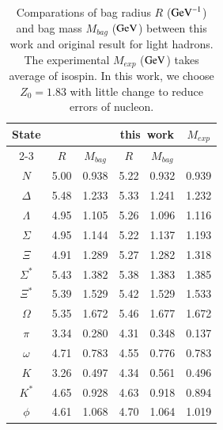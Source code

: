 \documentclass[prd,twocolumn,floatfix,nofootinbib]{revtex4}
\begin{document}
\renewcommand{\tabcolsep}{0.39cm}
\renewcommand{\arraystretch}{1.3}
\begin{table}[!htbp]
    \caption{Comparations of bag radius $R$ (${\rm GeV}^{-1}$) and bag mass $M_{bag}$ (${\rm GeV}$) between this work and original result for light hadrons.
    The experimental $M_{exp}$ (${\rm GeV}$) takes average of isospin.
    In this work, we choose $Z_{0}=1.83$ with little change to reduce errors of nucleon.}
    \label{tab:lighthadron}
    \begin{tabular}{cccccc}
        \hline\hline
        \multirow{2}{*}{State} & \multicolumn{2}{c}{\cite{Johnson:1975zp}} & \multicolumn{2}{c}{\rm this\ work} & \multirow{2}{*}{$M_{exp}$} \\ 
        \cline{2-3} \cline{4-5} 
        & $R$ & $M_{bag}$ & $R$ & $M_{bag}$ \\ \hline
        $N$               &5.00      &0.938      &5.22      &0.932      &0.939  \\ 
        $\Delta$          &5.48      &1.233      &5.33      &1.241      &1.232  \\ 
        $\Lambda$         &4.95      &1.105      &5.26      &1.096      &1.116  \\ 
        $\Sigma$          &4.95      &1.144      &5.22      &1.137      &1.193  \\ 
        $\Xi$             &4.91      &1.289      &5.27      &1.282      &1.318  \\ 
        $\Sigma^{\ast}$   &5.43      &1.382      &5.38      &1.383      &1.385  \\ 
        $\Xi^{\ast}$      &5.39      &1.529      &5.42      &1.529      &1.533  \\ 
        $\Omega$          &5.35      &1.672      &5.46      &1.677      &1.672  \\ 
        $\pi$             &3.34      &0.280      &4.31      &0.348      &0.137  \\ 
        $\omega$          &4.71      &0.783      &4.55      &0.776      &0.783  \\ 
        $K$               &3.26      &0.497      &4.34      &0.561      &0.496  \\ 
        $K^{\ast}$        &4.65      &0.928      &4.63      &0.918      &0.894  \\ 
        $\phi$            &4.61      &1.068      &4.70      &1.064      &1.019  \\ 
        \hline\hline
    \end{tabular}
\end{table}
\end{document}
